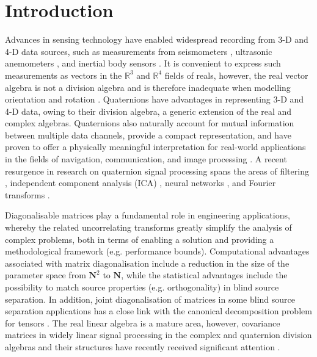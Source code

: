 \documentclass[review]{elsarticle}
\theoremstyle{plain}
\theoremstyle{remark}
\theoremstyle{plain}
\theoremstyle{definition}
\theoremstyle{prop}
\theoremstyle{definition}
\theoremstyle{plain}
\theoremstyle{plain}
\begin{document}
\section{Introduction}
Advances in sensing technology have enabled widespread recording from 3-D and 4-D data sources, such as measurements from seismometers \cite{Krieger2015}, ultrasonic anemometers \cite{CheongTook2011c}, and inertial body sensors \cite{Fourati2014}. It is convenient to express such measurements as vectors in the $\mathbb{R}^3$ and $\mathbb{R}^4$ fields of reals, however, the real vector algebra is not a division algebra and is therefore inadequate when modelling orientation and rotation \cite{Kuipers1999}. Quaternions have advantages in representing 3-D and 4-D data, owing to their division algebra, a generic extension of the real and complex algebras. Quaternions also naturally account for mutual information between multiple data channels, provide a compact representation, and have proven to offer a physically meaningful interpretation for real-world applications in the fields of navigation, communication, and image processing \cite{Tao2014,Chen2014}. A recent resurgence in research on quaternion signal processing spans the areas of filtering \cite{CheongTook2009}, independent component analysis (ICA) \cite{Via2011,Javidi2011}, neural networks \cite{Xia2015,Minemoto2017}, and Fourier transforms \cite{Ell2014}.

Diagonalisable matrices play a fundamental role in engineering applications, whereby the related uncorrelating transforms greatly simplify the analysis of complex problems, both in terms of enabling a solution and providing a methodological framework (e.g. performance bounds). Computational advantages associated with matrix diagonalisation include a reduction in the size of the parameter space from $\mathbf{N}^2$ to $\mathbf{N}$, while the statistical advantages include the possibility to match source properties (e.g. orthogonality) in blind source separation. In addition, joint diagonalisation of matrices in some blind source separation applications has a close link with the canonical decomposition problem for tensors \cite{DeLathauwer2006,Cichocki2015}. The real linear algebra is a mature area, however, covariance matrices in widely linear signal processing \cite{de2002} in the complex and quaternion division algebras and their structures \cite{Eriksson2006} have recently received significant attention \cite{schreier2010statistical,adali2010adaptive,yeredor2012,Via2010,CheongTook2011b}. 
\end{document}
